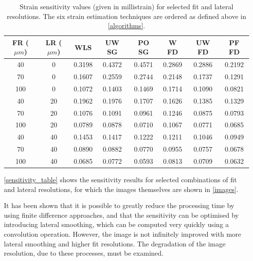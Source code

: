 \begin{table}[h]
	\begin{center}
		\begin{tabular}{|c||c||c|c|c|c|c|c|}
			\hline 
			FR ($\mu m$) & LR ($\mu m$) & WLS & UW SG & PO SG & W FD & UW FD & PF FD \\
			\hline
			\hline
			40 & 0 & 0.3198 & 0.4372 & 0.4571 & 0.2869 & 0.2886 & 0.2192 \\
			\hline
			70 & 0 & 0.1607 & 0.2559 & 0.2744 & 0.2148 & 0.1737 & 0.1291 \\
			\hline
			100 & 0 & 0.1072 & 0.1403 & 0.1469 & 0.1714 & 0.1090 & 0.0821 \\
			\hline
			40 & 20 & 0.1962 & 0.1976 & 0.1707 & 0.1626 & 0.1385 & 0.1329 \\
			\hline
			70 & 20 & 0.1076 & 0.1091 & 0.0961 & 0.1246 & 0.0875 & 0.0793 \\
			\hline
			100 & 20 & 0.0789 & 0.0878 & 0.0710 & 0.1067 & 0.0771 & 0.0685 \\
			\hline
			40 & 40 & 0.1453 & 0.1417 & 0.1222 & 0.1211 & 0.1046 & 0.0949 \\
			\hline
			70 & 40 & 0.0890 & 0.0882 & 0.0770 & 0.0955 & 0.0757 & 0.0678 \\
			\hline
			100 & 40 & 0.0685 & 0.0772 & 0.0593 & 0.0813 & 0.0709 & 0.0632 \\
			\hline
		\end{tabular}
	\end{center}
	\caption{Strain sensitivity values (given in millistrain) for selected fit and lateral resolutions. The six strain estimation techniques are ordered as defined above in \autoref{algorithms}.}
	\label{sensitivity_table}
\end{table}

\autoref{sensitivity_table} shows the sensitivity results for selected combinations of fit and lateral resolutions, for which the images themselves are shown in \autoref{images}.

It has been shown that it is possible to greatly reduce the processing time by using finite difference approaches, and that the sensitivity can be optimised by introducing lateral smoothing, which can be computed very quickly using a convolution operation. However, the image is not infinitely improved with more lateral smoothing and higher fit resolutions. The degradation of the image resolution, due to these processes, must be examined. 

